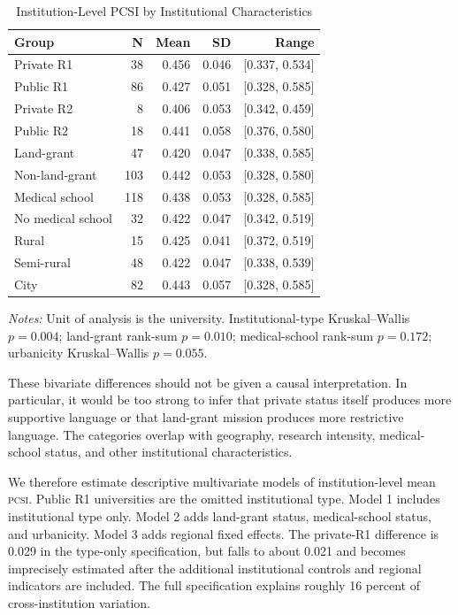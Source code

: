 \documentclass[12pt]{article}
\newcommand{\PCSI}{\textsc{pcsi}}
\begin{document}
\begin{table}[H]
\centering
\caption{Institution-Level PCSI by Institutional Characteristics}
\label{tab:groups}
\begin{threeparttable}
\small
\begin{tabular}{lrrrr}
\toprule
\textbf{Group} & \textbf{N} & \textbf{Mean} & \textbf{SD} & \textbf{Range}\\
\midrule
Private R1 & 38 & 0.456 & 0.046 & [0.337, 0.534]\\
Public R1 & 86 & 0.427 & 0.051 & [0.328, 0.585]\\
Private R2 & 8 & 0.406 & 0.053 & [0.342, 0.459]\\
Public R2 & 18 & 0.441 & 0.058 & [0.376, 0.580]\\
\addlinespace
Land-grant & 47 & 0.420 & 0.047 & [0.338, 0.585]\\
Non-land-grant & 103 & 0.442 & 0.053 & [0.328, 0.580]\\
\addlinespace
Medical school & 118 & 0.438 & 0.053 & [0.328, 0.585]\\
No medical school & 32 & 0.422 & 0.047 & [0.342, 0.519]\\
\addlinespace
Rural & 15 & 0.425 & 0.041 & [0.372, 0.519]\\
Semi-rural & 48 & 0.422 & 0.047 & [0.338, 0.539]\\
City & 82 & 0.443 & 0.057 & [0.328, 0.585]\\
\bottomrule
\end{tabular}
\begin{tablenotes}\footnotesize
\item \textit{Notes:} Unit of analysis is the university. Institutional-type Kruskal--Wallis $p=0.004$; land-grant rank-sum $p=0.010$; medical-school rank-sum $p=0.172$; urbanicity Kruskal--Wallis $p=0.055$.
\end{tablenotes}
\end{threeparttable}
\end{table}

These bivariate differences should not be given a causal interpretation. In particular, it would be too strong to infer that private status itself produces more supportive language or that land-grant mission produces more restrictive language. The categories overlap with geography, research intensity, medical-school status, and other institutional characteristics.

We therefore estimate descriptive multivariate models of institution-level mean \PCSI{}. Public R1 universities are the omitted institutional type. Model 1 includes institutional type only. Model 2 adds land-grant status, medical-school status, and urbanicity. Model 3 adds regional fixed effects. The private-R1 difference is 0.029 in the type-only specification, but falls to about 0.021 and becomes imprecisely estimated after the additional institutional controls and regional indicators are included. The full specification explains roughly 16 percent of cross-institution variation.
\end{document}
